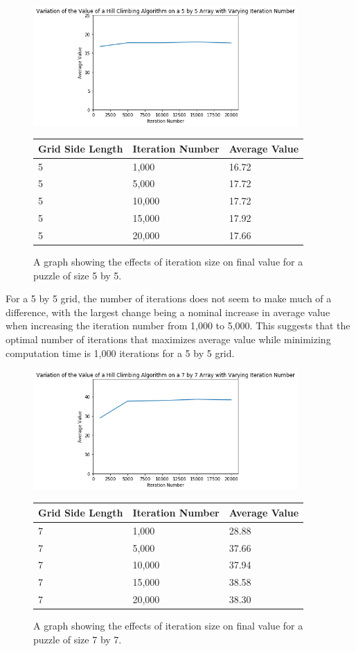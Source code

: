 \documentclass[12pt]{article}
\begin{document}
\begin{figure}[H]
    \centering
    \includegraphics[width=0.9\textwidth]{hill_climbing_5x5_iterations}
\begin{tabular}{ |p{4cm}||p{4cm}|p{4cm}|  }
 \hline
Grid Side Length& Iteration Number &Average Value\\
 \hline
5&1,000&16.72\\
5&5,000&17.72\\
5&10,000&17.72\\
5&15,000&17.92\\
5&20,000&17.66\\
 \hline
\end{tabular}
    \caption{A graph showing the effects of iteration size on final value for a puzzle of size 5 by 5.}
    \label{fig:hill_climbing_5x5_iterations}
\end{figure}

For a 5 by 5 grid, the number of iterations does not seem to make much of a difference, with the largest change being a nominal increase in average value when increasing the iteration number from 1,000 to 5,000. This suggests that the optimal number of iterations that maximizes average value while minimizing computation time is 1,000 iterations for a 5 by 5 grid.

\begin{figure}[H]
    \centering
    \includegraphics[width=0.9\textwidth]{hill_climbing_7x7_iterations}
\begin{tabular}{ |p{4cm}||p{4cm}|p{4cm}|  }
 \hline
Grid Side Length& Iteration Number &Average Value\\
 \hline
7&1,000&28.88\\
7&5,000&37.66\\
7&10,000&37.94\\
7&15,000&38.58\\
7&20,000&38.30\\
 \hline
\end{tabular}
    \caption{A graph showing the effects of iteration size on final value for a puzzle of size 7 by 7.}
    \label{fig:hill_climbing_7x7_iterations}
\end{figure}
\end{document}
